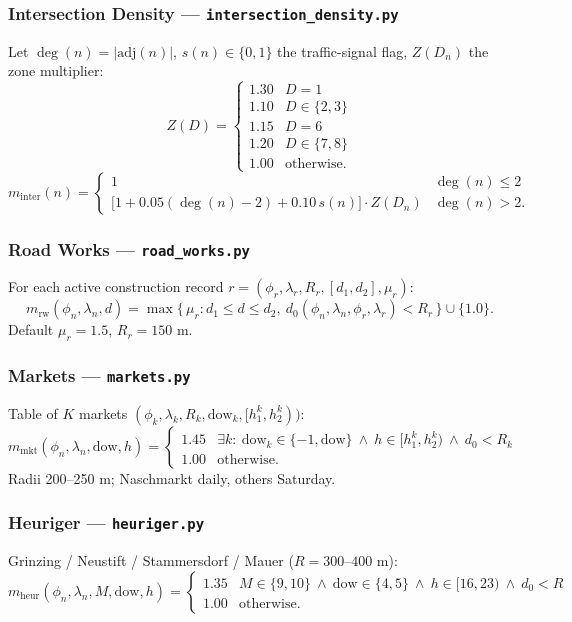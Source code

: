 \documentclass[12pt,a4paper]{article}
\begin{document}
\subsubsection{Intersection Density — \texttt{intersection\_density.py}}
Let $\deg(n)=|\mathrm{adj}(n)|$, $s(n)\in\{0,1\}$ the traffic-signal flag, $Z(D_n)$ the zone multiplier:
\[
Z(D) =
\begin{cases}
1.30 & D=1 \\
1.10 & D\in\{2,3\} \\
1.15 & D=6 \\
1.20 & D\in\{7,8\} \\
1.00 & \text{otherwise.}
\end{cases}
\]
\[
m_{\text{inter}}(n) =
\begin{cases}
1 & \deg(n)\le 2 \\
\bigl[1 + 0.05(\deg(n)-2) + 0.10\,s(n)\bigr]\cdot Z(D_n) & \deg(n)>2.
\end{cases}
\]

\subsubsection{Road Works — \texttt{road\_works.py}}
For each active construction record $r=(\phi_r,\lambda_r,R_r,[d_1,d_2],\mu_r)$:
\[
m_{\text{rw}}(\phi_n,\lambda_n,d) = \max\bigl\{\,\mu_r : d_1\le d\le d_2,\ d_0(\phi_n,\lambda_n,\phi_r,\lambda_r)<R_r\,\bigr\}\cup\{1.0\}.
\]
Default $\mu_r=1.5$, $R_r=150$ m.

\subsubsection{Markets — \texttt{markets.py}}
Table of $K$ markets $(\phi_k,\lambda_k,R_k,\text{dow}_k,[h_1^k,h_2^k))$:
\[
m_{\text{mkt}}(\phi_n,\lambda_n,\text{dow},h) =
\begin{cases}
1.45 & \exists k:\ \text{dow}_k\in\{-1,\text{dow}\}\ \land\ h\in[h_1^k,h_2^k)\ \land\ d_0<R_k \\
1.00 & \text{otherwise.}
\end{cases}
\]
Radii 200–250 m; Naschmarkt daily, others Saturday.

\subsubsection{Heuriger — \texttt{heuriger.py}}
Grinzing / Neustift / Stammersdorf / Mauer ($R = 300$–$400$ m):
\[
m_{\text{heur}}(\phi_n,\lambda_n,M,\text{dow},h) =
\begin{cases}
1.35 & M\in\{9,10\}\ \land\ \text{dow}\in\{4,5\}\ \land\ h\in[16,23)\ \land\ d_0<R \\
1.00 & \text{otherwise.}
\end{cases}
\]
\end{document}
